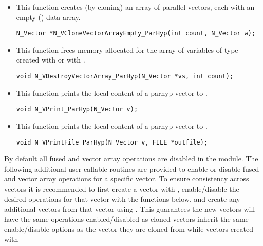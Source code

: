 \begin{itemize}
\item {}
 
  This function creates (by cloning) an array of  parallel vectors,
  each with an empty () data array.
 
\begin{verbatim}
N_Vector *N_VCloneVectorArrayEmpty_ParHyp(int count, N_Vector w);
\end{verbatim}


\item {}
 
 This function frees memory allocated for the array of   variables of
 type  created with  or with
 .
 

 \verb|void N_VDestroyVectorArray_ParHyp(N_Vector *vs, int count);|



\item {}
  
  This function prints the local content of a parhyp vector to .
    
  \verb|void N_VPrint_ParHyp(N_Vector v);|


\item {}
  
  This function prints the local content of a parhyp vector to .
    
  \verb|void N_VPrintFile_ParHyp(N_Vector v, FILE *outfile);|

\end{itemize}
By default all fused and vector array operations are disabled in the {\nvecph}
module. The following additional user-callable routines are provided to
enable or disable fused and vector array operations for a specific vector. To
ensure consistency across vectors it is recommended to first create a vector
with , enable/disable the desired operations for that vector
with the functions below, and create any additional vectors from that vector
using . This guarantees the new vectors will have the same
operations enabled/disabled as cloned vectors inherit the same enable/disable
options as the vector they are cloned from while vectors created with
